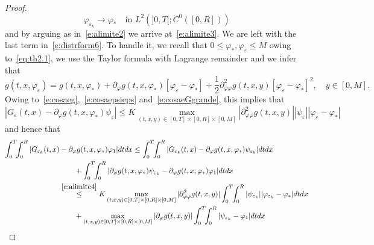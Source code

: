 \documentclass[11pt,leqno]{amsart}
\numberwithin{equation}{section}
\begin{document}
\begin{proof}
\begin{equation}
\label{e:alimite5}
    {\varphi}_{{\varepsilon}_k} \to {\varphi}_\ast \quad 
    \text{in $L^2 (]0, T[; C^0 ([0, R]))$}
\end{equation}
and by arguing as in~\eqref{e:alimite2} we arrive 
at~\eqref{e:alimite3}. 
We are left with the last term in~\eqref{e:distrform6}. 
To handle it, we recall that $0 \leq {\varphi}_\ast, {\varphi}_{\varepsilon} \leq M$ owing to~\eqref{eq:th2.1}, we use the Taylor formula with Lagrange remainder and we infer
that 
\begin{equation*}
  g(t, x, {\varphi}_{\varepsilon}) =
  g(t, x, {\varphi}_\ast) + \partial_{\varphi} g (t, x, {\varphi}_\ast) [{\varphi}_{\varepsilon} - {\varphi}_\ast]+
  \frac{1}{2} \partial^2_{{\varphi} {\varphi}} 
  g (t, x, y) [{\varphi}_{\varepsilon} - {\varphi}_\ast]^2, \quad
  y \in [0, M]. 
\end{equation*}
Owing to~\eqref{e:cosaeg},~\eqref{e:cosaepsieps} and~\eqref{e:cosaeGgrande}, this implies that
\begin{equation}
  \label{e:alimite4}
  | G_{\varepsilon}(t, x) -  \partial_{\varphi} g (t, x, {\varphi}_\ast) \psi_{\varepsilon} | 
  \leq K \max_{(t, x, y) \in [0, T] \times [0, R] \times [0, M]}
  |\partial^2_{{\varphi} {\varphi}} 
  g (t, x, y)| |\psi_{\varepsilon}| |{\varphi}_{\varepsilon} -{\varphi}_\ast|     
\end{equation}
and hence that 
\begin{equation}
  \label{e:alimite42}
  \begin{split}
    \int_0^T \! \! \int_0^R | G_{{\varepsilon}_k}(t, x) & - \partial_{\varphi} g (t,
    x, {\varphi}_\ast) {\varphi}_1 | dtdx \leq \int_0^T \! \! \int_0^R | G_{{\varepsilon}_k}
    (t, x) - \partial_{\varphi} g (t, x, {\varphi}_\ast)
    \psi_{{\varepsilon}_k} | dtdx 
    \\
    & \qquad + \int_0^T \! \! \int_0^R |
    \partial_{\varphi} g (t, x, {\varphi}_\ast)
    \psi_{{\varepsilon}_k} - \partial_{\varphi} g (t, x, {\varphi}_\ast)  {\varphi}_1 | dtdx 
    \\
    & \stackrel{\eqref{e:alimite4}}{\leq} K \max_{(t, x, y) \in [0, T]
      \times [0, R] \times [0, M]} |\partial^2_{{\varphi} {\varphi}} g (t, x,
    y)| \int_0^T \! \! \int_0^R |\psi_{{\varepsilon}_k}| |{\varphi}_{{\varepsilon}_k}
    -{\varphi}_\ast| dtdx
    \\
    & \qquad + \max_{(t, x, y) \in [0, T] \times [0, R] \times [0, M]}
    |\partial_{\varphi}
    g (t, x, y)| \int_0^T \! \! \int_0^R |\psi_{{\varepsilon}_k} - {\varphi}_1| dtdx

\end{split}
\end{equation}
\end{proof}
\end{document}
